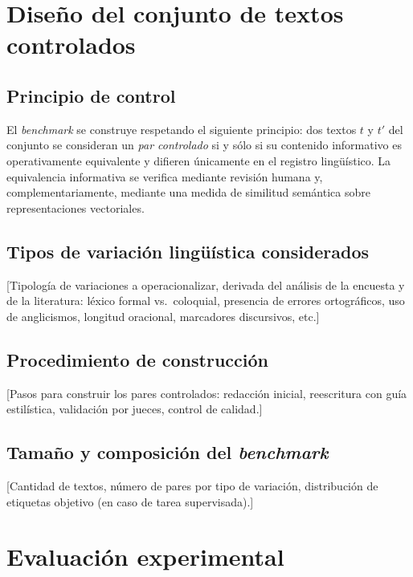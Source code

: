 \section{Diseño del conjunto de textos controlados}
\label{sec:benchmark-diseno}

\subsection{Principio de control}

El \emph{benchmark} se construye respetando el siguiente principio: dos textos
$t$ y $t'$ del conjunto se consideran un \emph{par controlado} si y sólo si su
contenido informativo es operativamente equivalente y difieren únicamente en
el registro lingüístico. La equivalencia informativa se verifica mediante
revisión humana y, complementariamente, mediante una medida de similitud
semántica sobre representaciones vectoriales.

\subsection{Tipos de variación lingüística considerados}

[Tipología de variaciones a operacionalizar, derivada del análisis de la
encuesta y de la literatura: léxico formal vs.\ coloquial, presencia de
errores ortográficos, uso de anglicismos, longitud oracional, marcadores
discursivos, etc.]

\subsection{Procedimiento de construcción}

[Pasos para construir los pares controlados: redacción inicial, reescritura
con guía estilística, validación por jueces, control de calidad.]

\subsection{Tamaño y composición del \textit{benchmark}}

[Cantidad de textos, número de pares por tipo de variación, distribución de
etiquetas objetivo (en caso de tarea supervisada).]

\section{Evaluación experimental}
\label{sec:experimentos}

